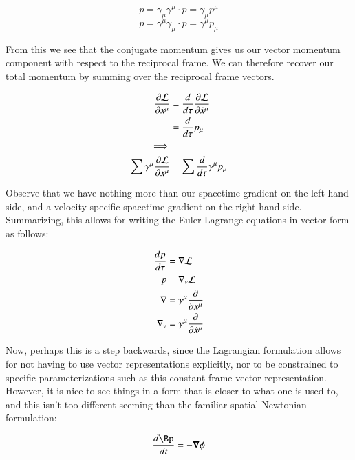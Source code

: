 \begin{equation*}
p = \gamma_{\mu} \gamma^{\mu} \cdot p = \gamma_{\mu} p^{\mu}
\end{equation*}
\begin{equation*}
p = \gamma^{\mu} \gamma_{\mu} \cdot p = \gamma^{\mu} p_{\mu}
\end{equation*}

From this we see that the conjugate momentum gives us our vector momentum 
component with respect to the reciprocal frame.  We can therefore recover 
our total momentum by summing over the reciprocal frame vectors.

\begin{align*}
\frac{\partial {\mathcal{L}}}{\partial {x^{\mu}}} 
&= \frac{d}{d\tau}\frac{\partial {\mathcal{L}}}{\partial {\dot{x}^{\mu}}} \\
&= \frac{d}{d\tau} p_{\mu} \\
\implies \\
\sum \gamma^{\mu} \frac{\partial {\mathcal{L}}}{\partial {x^{\mu}}} &= \sum \frac{d}{d\tau} \gamma^{\mu} p_{\mu} \\
\end{align*}

Observe that we have nothing more than our spacetime gradient on the left hand side, and a velocity
specific spacetime gradient on the right hand side.  Summarizing, this allows for writing the Euler-Lagrange equations in vector form as follows:

\begin{align}
\frac{d p}{d\tau} &= \nabla \mathcal{L} \\
p &= \nabla_v \mathcal{L} \\
\nabla &= \gamma^{\mu} \frac{\partial {}}{\partial {x^{\mu}}} \\
\nabla_v &= \gamma^{\mu} \frac{\partial {}}{\partial {\dot{x}^{\mu}}}
\end{align}

Now, perhaps this is a step backwards, since the Lagrangian formulation allows for not having to use vector representations explicitly, nor to be constrained to specific parameterizations such as this constant frame vector representation.  However, it is nice to see things in a form that is closer to what one is used to, and this isn't too different seeming than the familiar spatial Newtonian formulation:

\begin{equation*}
\frac{d\Bp}{dt} = -\spacegrad \phi
\end{equation*}

